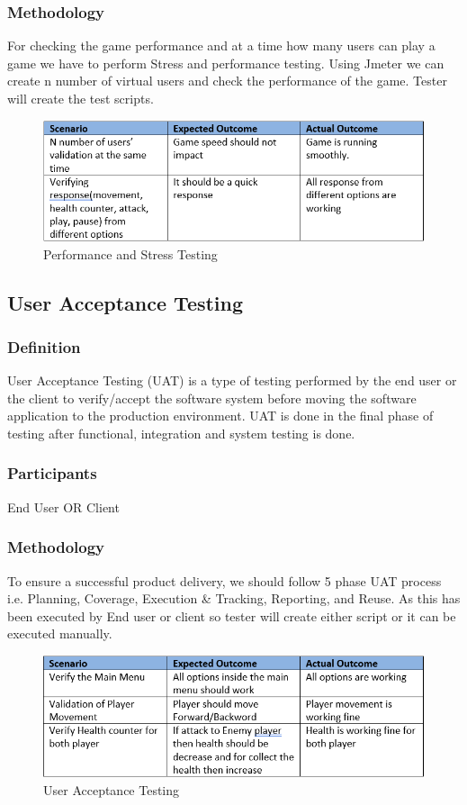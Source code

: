 \documentclass{article}
\begin{document}
\subsubsection{Methodology}
For checking the game performance and at a time how many users can play a game we have to perform Stress and performance testing. Using Jmeter we can create n number of virtual users and check the performance of the game. Tester will create the test scripts.\cite{ST}
\begin{figure}[h]
    \centering
    \includegraphics[scale=0.9]{./images/performanceAndStress.PNG}
    \caption{Performance and Stress Testing}
    \label{fig:my_label}
\end{figure}
\subsection{User Acceptance Testing }
\subsubsection{Definition}
User Acceptance Testing (UAT) is a type of testing performed by the end user or the client to verify/accept the software system before moving the software application to the production environment. UAT is done in the final phase of testing after functional, integration and system testing is done.\cite{AT}
\subsubsection{Participants}
End User OR Client
\subsubsection{Methodology}
To ensure a successful product delivery, we should follow 5 phase UAT process i.e. Planning, Coverage, Execution & Tracking, Reporting, and Reuse. As this has been executed by End user or client so tester will create either script or it can be executed manually.
\begin{figure}[h]
    \centering
    \includegraphics[scale=0.9]{./images/UserAcceptance.PNG}
    \caption{User Acceptance Testing}
    \label{fig:my_label}
\end{figure}
\end{document}
